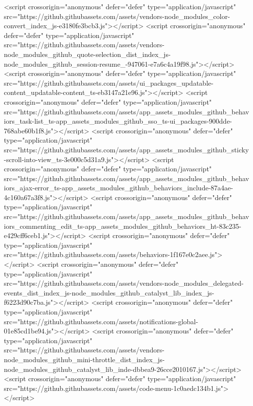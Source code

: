 <script crossorigin="anonymous" defer="defer" type="application/javascript" src="https://github.githubassets.com/assets/vendors-node_modules_color-convert_index_js-e3180fe3bcb3.js"></script>
<script crossorigin="anonymous" defer="defer" type="application/javascript" src="https://github.githubassets.com/assets/vendors-node_modules_github_quote-selection_dist_index_js-node_modules_github_session-resume_-947061-e7a6c4a19f98.js"></script>
<script crossorigin="anonymous" defer="defer" type="application/javascript" src="https://github.githubassets.com/assets/ui_packages_updatable-content_updatable-content_ts-eb3147a21e96.js"></script>
<script crossorigin="anonymous" defer="defer" type="application/javascript" src="https://github.githubassets.com/assets/app_assets_modules_github_behaviors_task-list_ts-app_assets_modules_github_sso_ts-ui_packages-900dde-768abe60b1f8.js"></script>
<script crossorigin="anonymous" defer="defer" type="application/javascript" src="https://github.githubassets.com/assets/app_assets_modules_github_sticky-scroll-into-view_ts-3e000c5d31a9.js"></script>
<script crossorigin="anonymous" defer="defer" type="application/javascript" src="https://github.githubassets.com/assets/app_assets_modules_github_behaviors_ajax-error_ts-app_assets_modules_github_behaviors_include-87a4ae-4c160a67a3f8.js"></script>
<script crossorigin="anonymous" defer="defer" type="application/javascript" src="https://github.githubassets.com/assets/app_assets_modules_github_behaviors_commenting_edit_ts-app_assets_modules_github_behaviors_ht-83c235-e429cff6ceb1.js"></script>
<script crossorigin="anonymous" defer="defer" type="application/javascript" src="https://github.githubassets.com/assets/behaviors-1f167e0c2aee.js"></script>
<script crossorigin="anonymous" defer="defer" type="application/javascript" src="https://github.githubassets.com/assets/vendors-node_modules_delegated-events_dist_index_js-node_modules_github_catalyst_lib_index_js-f6223d90c7ba.js"></script>
<script crossorigin="anonymous" defer="defer" type="application/javascript" src="https://github.githubassets.com/assets/notifications-global-01e85cd1be94.js"></script>
<script crossorigin="anonymous" defer="defer" type="application/javascript" src="https://github.githubassets.com/assets/vendors-node_modules_github_mini-throttle_dist_index_js-node_modules_github_catalyst_lib_inde-dbbea9-26cce2010167.js"></script>
<script crossorigin="anonymous" defer="defer" type="application/javascript" src="https://github.githubassets.com/assets/code-menu-1c0aedc134b1.js"></script>
  
